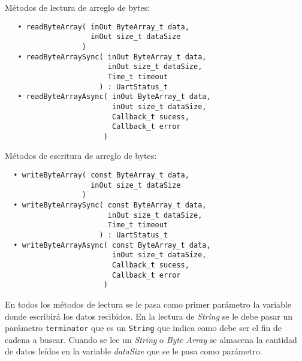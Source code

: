 Métodos de lectura de arreglo de bytes:

\begin{verbatim}
   • readByteArray( inOut ByteArray_t data,
                    inOut size_t dataSize
                  )
   • readByteArraySync( inOut ByteArray_t data,
                        inOut size_t dataSize,
                        Time_t timeout
                      ) : UartStatus_t
   • readByteArrayAsync( inOut ByteArray_t data, 
                         inOut size_t dataSize,
                         Callback_t sucess,
                         Callback_t error 
                       )
\end{verbatim}

Métodos de escritura de arreglo de bytes:

\begin{verbatim}
  • writeByteArray( const ByteArray_t data,
                    inOut size_t dataSize
                  )
  • writeByteArraySync( const ByteArray_t data,
                        inOut size_t dataSize,
                        Time_t timeout
                      ) : UartStatus_t
  • writeByteArrayAsync( const ByteArray_t data, 
                         inOut size_t dataSize,
                         Callback_t sucess,
                         Callback_t error
                       )
\end{verbatim}

En todos los métodos de lectura se le pasa como primer parámetro la variable donde escribirá los datos recibidos. En la lectura de \emph{String} se le debe pasar un parámetro \texttt{terminator} que es un \texttt{String} que indica como debe ser el fin de cadena a buscar. Cuando se lee un \emph{String} o \emph{Byte Array} se almacena la cantidad de datos leídos en la variable \emph{dataSize} que se le pasa como parámetro.
